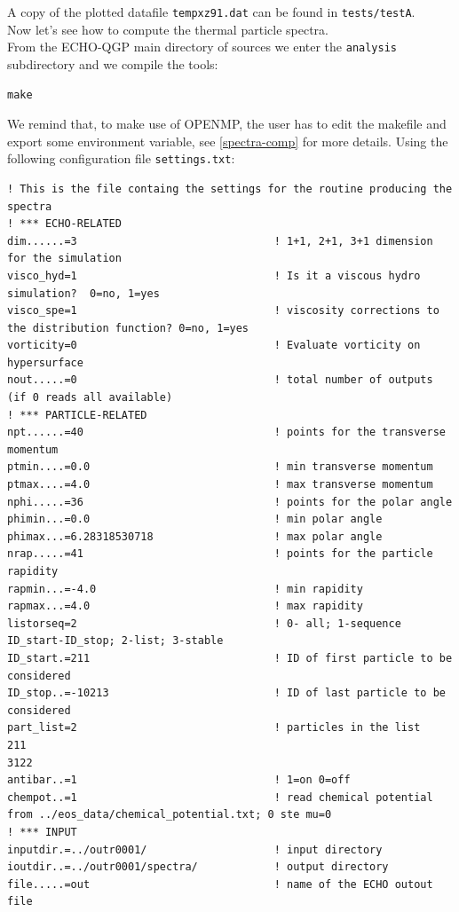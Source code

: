 A copy of the plotted datafile {\tt tempxz91.dat} can be found in {\tt tests/testA}.\\
Now let's see how to compute the thermal particle spectra.\\
From the ECHO-QGP main directory of sources we enter the {\tt analysis} subdirectory and we compile the tools:
\begin{lstlisting}[numbers=none]
make
\end{lstlisting}
We remind that, to make use of OPENMP, the user has to edit the makefile and export some environment variable, see \ref{spectra-comp} for more details.
Using the following configuration file {\tt settings.txt}:
\begin{lstlisting}[numbers=none]
! This is the file containg the settings for the routine producing the spectra 
! *** ECHO-RELATED
dim......=3                               ! 1+1, 2+1, 3+1 dimension for the simulation
visco_hyd=1                               ! Is it a viscous hydro simulation?  0=no, 1=yes
visco_spe=1                               ! viscosity corrections to the distribution function? 0=no, 1=yes
vorticity=0                               ! Evaluate vorticity on hypersurface
nout.....=0                               ! total number of outputs (if 0 reads all available)
! *** PARTICLE-RELATED
npt......=40                              ! points for the transverse momentum
ptmin....=0.0                             ! min transverse momentum
ptmax....=4.0                             ! max transverse momentum
nphi.....=36                              ! points for the polar angle 
phimin...=0.0                             ! min polar angle 
phimax...=6.28318530718                   ! max polar angle 
nrap.....=41                              ! points for the particle rapidity 
rapmin...=-4.0                            ! min rapidity
rapmax...=4.0                             ! max rapidity 
listorseq=2                               ! 0- all; 1-sequence ID_start-ID_stop; 2-list; 3-stable
ID_start.=211                             ! ID of first particle to be considered
ID_stop..=-10213                          ! ID of last particle to be considered
part_list=2                               ! particles in the list 
211
3122
antibar..=1                               ! 1=on 0=off
chempot..=1                               ! read chemical potential from ../eos_data/chemical_potential.txt; 0 ste mu=0
! *** INPUT 
inputdir.=../outr0001/                    ! input directory 
ioutdir..=../outr0001/spectra/            ! output directory
file.....=out                             ! name of the ECHO outout file

\end{lstlisting}
